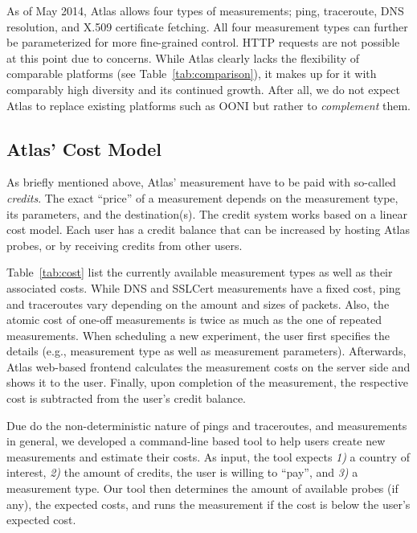 As of May 2014, Atlas allows four types of measurements; ping, traceroute, DNS
resolution, and X.509 certificate fetching.  All four measurement types can
further be parameterized for more fine-grained control.  HTTP requests are not
possible at this point due to concerns.  While Atlas clearly lacks the
flexibility of comparable platforms (see Table~\ref{tab:comparison}), it makes
up for it with comparably high diversity and its continued growth.  After all,
we do not expect Atlas to replace existing platforms such as OONI but rather to
\emph{complement} them.



\subsection{Atlas' Cost Model}

As briefly mentioned above, Atlas' measurement have to be paid with so-called
\emph{credits}.  The exact ``price'' of a measurement depends on the
measurement type, its parameters, and the destination(s).  The credit system
works based on a linear cost model.  Each user has a credit balance that can be
increased by hosting Atlas probes, or by receiving credits from other users.

Table~\ref{tab:cost} list the currently available measurement types as well as
their associated costs.  While DNS and SSLCert measurements have a fixed cost,
ping and traceroutes vary depending on the amount and sizes of packets.  Also,
the atomic cost of one-off measurements is twice as much as the one of repeated
measurements.  When scheduling a new experiment, the user first specifies the
details (e.g., measurement type as well as measurement parameters).  Afterwards,
Atlas web-based frontend calculates the measurement costs on the server side and
shows it to the user.  Finally, upon completion of the measurement, the
respective cost is subtracted from the user's credit balance.

Due do the non-deterministic nature of pings and traceroutes, and measurements
in general, we developed a command-line based tool to help users create new
measurements and estimate their costs.  As input, the tool expects \emph{1)} a
country of interest, \emph{2)} the amount of credits, the user is willing to
``pay'', and \emph{3)} a measurement type.  Our tool then determines the amount
of available probes (if any), the expected costs, and runs the measurement if
the cost is below the user's expected cost.

